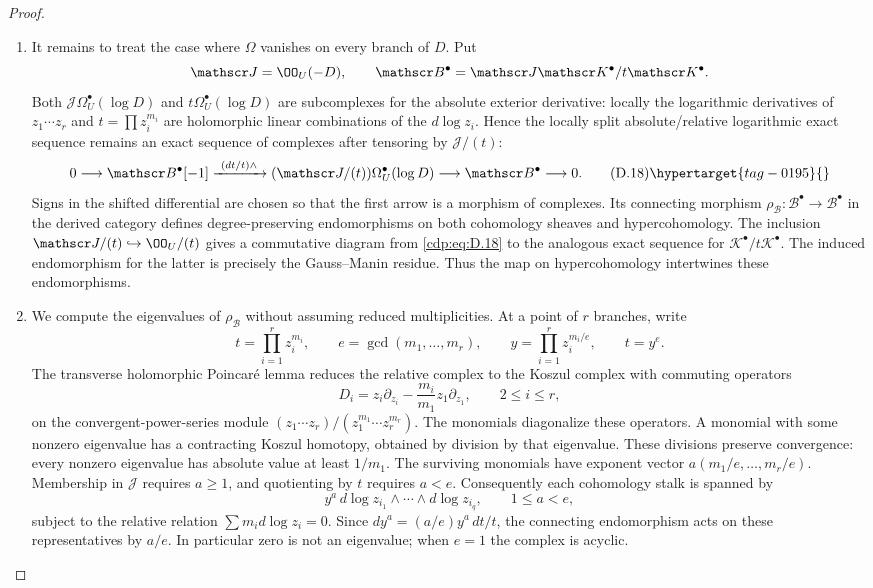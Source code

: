 \begin{proof}
\begin{enumerate}[label={$\langle1\rangle$\arabic*.},leftmargin=*]
\item It remains to treat the case where $\Omega$ vanishes on every
branch of $D$. Put
\[
 \mathscr J=\OO_U(-D),\qquad
 \mathscr B^\bullet=
 \mathscr J\mathscr K^\bullet/t\mathscr K^\bullet.
\]
Both $\mathscr J\Omega_U^\bullet(\log D)$ and
$t\Omega_U^\bullet(\log D)$ are subcomplexes for the absolute
exterior derivative: locally the logarithmic derivatives of
$z_1\cdots z_r$ and $t=\prod z_i^{m_i}$ are holomorphic
linear combinations of the $d\log z_i$. Hence the locally split
absolute/relative logarithmic exact sequence remains an exact
sequence of complexes after tensoring by $\mathscr J/(t)$:
\[
0\longrightarrow\mathscr B^\bullet[-1]
 \xrightarrow{\ (dt/t)\wedge\ }
 (\mathscr J/(t))\Omega_U^\bullet(\log D)
 \longrightarrow\mathscr B^\bullet\longrightarrow0.
\tag{D.18}\hypertarget{tag-0195}{}\label{cdp:eq:D.18}
\]
Signs in the shifted differential are chosen so that the first
arrow is a morphism of complexes. Its connecting morphism
$\rho_{\mathscr B}:\mathscr B^\bullet\to\mathscr B^\bullet$
in the derived category defines degree-preserving endomorphisms
on both cohomology sheaves and hypercohomology. The inclusion
$\mathscr J/(t)\hookrightarrow\OO_U/(t)$ gives a commutative
diagram from \eqref{cdp:eq:D.18} to the analogous exact sequence for
$\mathscr K^\bullet/t\mathscr K^\bullet$. The induced
endomorphism for the latter is precisely the Gauss--Manin
residue. Thus the map on hypercohomology intertwines these
endomorphisms.

\item We compute the eigenvalues of $\rho_{\mathscr B}$ without
assuming reduced multiplicities. At a point of $r$ branches,
write
\[
 t=\prod_{i=1}^r z_i^{m_i},\qquad
 e=\gcd(m_1,\ldots,m_r),\qquad
 y=\prod_{i=1}^r z_i^{m_i/e},\qquad t=y^e.
\]
The transverse holomorphic Poincar\'e lemma reduces the relative
complex to the Koszul complex with commuting operators
\[
 D_i=z_i\partial_{z_i}
           -\frac{m_i}{m_1}z_1\partial_{z_1},
 \qquad 2\le i\le r,
\]
on the convergent-power-series module
$(z_1\cdots z_r)/(z_1^{m_1}\cdots z_r^{m_r})$.
The monomials diagonalize these operators. A monomial with some
nonzero eigenvalue has a contracting Koszul homotopy, obtained
by division by that eigenvalue. These divisions preserve
convergence: every nonzero eigenvalue has absolute value at
least $1/m_1$. The surviving monomials have exponent vector
$a(m_1/e,\ldots,m_r/e)$. Membership in $\mathscr J$ requires
$a\ge1$, and quotienting by $t$ requires $a<e$. Consequently
each cohomology stalk is spanned by
\[
 y^a\,d\log z_{i_1}\wedge\cdots\wedge d\log z_{i_q},
 \qquad 1\le a<e,
\]
subject to the relative relation $\sum m_i d\log z_i=0$.
Since $dy^a=(a/e)y^a\,dt/t$, the connecting endomorphism
acts on these representatives by $a/e$. In particular zero is
not an eigenvalue; when $e=1$ the complex is acyclic.


\end{enumerate}
\end{proof}
